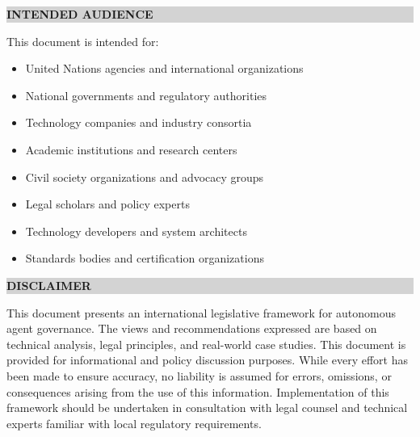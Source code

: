 \documentclass[12pt,a4paper,twoside,openright]{book}
\begin{document}
\vspace{1.2cm}

\noindent\colorbox{lightgray}{%
    \parbox{\dimexpr\textwidth-2\fboxsep\relax}{%
        \vspace{12pt}
        \sffamily\normalsize
        \textbf{\textcolor{legislativeblue}{INTENDED AUDIENCE}}
        \vspace{12pt}
    }%
}

\vspace{0.4cm}

\noindent This document is intended for:

\begin{itemize}[leftmargin=1.8cm]
    \item United Nations agencies and international organizations
    \item National governments and regulatory authorities
    \item Technology companies and industry consortia
    \item Academic institutions and research centers
    \item Civil society organizations and advocacy groups
    \item Legal scholars and policy experts
    \item Technology developers and system architects
    \item Standards bodies and certification organizations
\end{itemize}

\vspace{1.2cm}

\noindent\colorbox{lightgray}{%
    \parbox{\dimexpr\textwidth-2\fboxsep\relax}{%
        \vspace{12pt}
        \sffamily\normalsize
        \textbf{\textcolor{legislativeblue}{DISCLAIMER}}
        \vspace{12pt}
    }%
}

\vspace{0.4cm}

\noindent\normalsize
This document presents an international legislative framework for autonomous agent governance. The views and recommendations expressed are based on technical analysis, legal principles, and real-world case studies. This document is provided for informational and policy discussion purposes. While every effort has been made to ensure accuracy, no liability is assumed for errors, omissions, or consequences arising from the use of this information. Implementation of this framework should be undertaken in consultation with legal counsel and technical experts familiar with local regulatory requirements.
\end{document}
